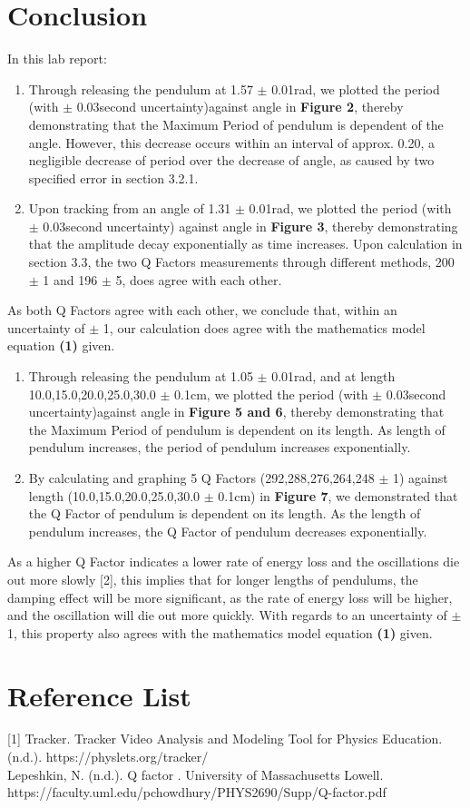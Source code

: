 \documentclass{article}
\begin{document}
\section{Conclusion}
In this lab report:
\begin{enumerate}
\item Through releasing the pendulum at 1.57 $\pm$ 0.01rad, we plotted the period (with $\pm$ 0.03second uncertainty)against angle in \textbf{Figure 2}, thereby demonstrating that the Maximum Period of pendulum is dependent of the angle. However, this decrease occurs within an interval of approx. 0.20, a negligible decrease of period over the decrease of angle, as caused by two specified error in section 3.2.1.
\item Upon tracking from an angle of 1.31 $\pm$ 0.01rad, we plotted the period (with $\pm$ 0.03second uncertainty) against angle in \textbf{Figure 3}, thereby demonstrating that the amplitude decay exponentially as time increases. Upon calculation in section 3.3, the two Q Factors measurements through different methods, 200 $\pm$ 1 and 196 $\pm$ 5, does agree with each other.
 \end{enumerate}
 
  As both Q Factors agree with each other, we conclude that, within an uncertainty of $\pm$ 1, our calculation does agree with the mathematics model equation \textbf{(1)} given. 
  
\begin{enumerate}
  \item Through releasing the pendulum at 1.05 $\pm$ 0.01rad, and at length 10.0,15.0,20.0,25.0,30.0 $\pm$ 0.1cm, we plotted the period (with $\pm$ 0.03second uncertainty)against angle in \textbf{Figure 5 and 6}, thereby demonstrating that the Maximum Period of pendulum is dependent on its length. As length of pendulum increases, the period of pendulum increases exponentially.
  \item By calculating and graphing 5 Q Factors (292,288,276,264,248 $\pm$ 1) against length (10.0,15.0,20.0,25.0,30.0 $\pm$ 0.1cm) in \textbf{Figure 7}, we demonstrated that the Q Factor of pendulum is dependent on its length. As the length of pendulum increases, the Q Factor of pendulum decreases exponentially. 
 \end{enumerate}
 As a higher Q Factor indicates a lower rate of energy loss and the oscillations die out more slowly [2], this implies that for longer lengths of pendulums, the damping effect will be more significant, as the rate of energy loss will be higher, and the oscillation will die out more quickly. With regards to an uncertainty of $\pm$ 1, this property also agrees with the mathematics model equation \textbf{(1)} given.



\section{Reference List}

[1] Tracker. Tracker Video Analysis and Modeling Tool for Physics Education. (n.d.). https://physlets.org/tracker/ \\

\noindent [2] Lepeshkin, N. (n.d.). Q factor . University of Massachusetts Lowell. \\
https://faculty.uml.edu/pchowdhury/PHYS2690/Supp/Q-factor.pdf 
\end{document}
